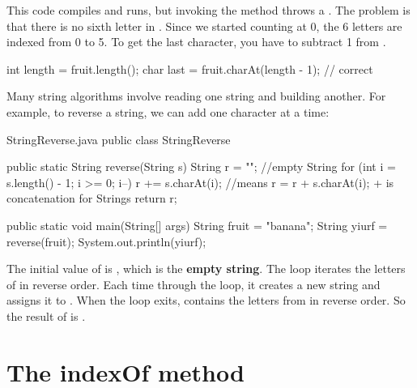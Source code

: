 
This code compiles and runs, but invoking the  method throws a .
The problem is that there is no sixth letter in .
Since we started counting at 0, the 6 letters are indexed from 0 to 5.
To get the last character, you have to subtract 1 from .

\begin{code}
int length = fruit.length();
char last = fruit.charAt(length - 1);  // correct
\end{code}

Many string algorithms involve reading one string and building another.
For example, to reverse a string, we can add one character at a time:

\begin{trinket} [290] {StringReverse.java}
public class StringReverse {
    
    public static String reverse(String s) {
       String r = ""; //empty String
       for (int i = s.length() - 1; i >= 0; i--) {
          r += s.charAt(i);  //means r = r + s.charAt(i);  + is concatenation for Strings
       }
       return r;
    }    
    
    public static void main(String[] args) {
       String fruit = "banana";
       String yiurf = reverse(fruit);
       System.out.println(yiurf);
    }
}
\end{trinket}


The initial value of  is , which is the {\bf empty string}.
The loop iterates the letters of  in reverse order.
Each time through the loop, it creates a new string and assigns it to .
When the loop exits,  contains the letters from  in reverse order.
So the result of  is .


\section{The indexOf method}

